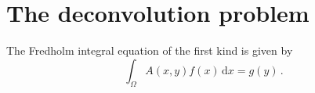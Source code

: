 \section{The deconvolution problem} %

The Fredholm integral equation of the first kind is given by
\begin{equation}
  \label{eq:deconvolution_problem:fredholm}
  \int_\Omega A(x, y) f(x) \, \mathrm{d}x = g(y) \, .
\end{equation}

\blindtext[3]

